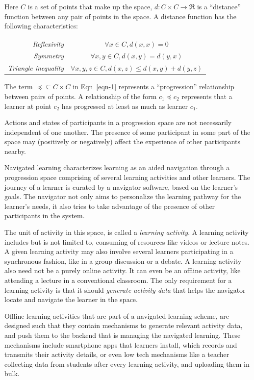 \begin{multicols}{2}
Here $C$ is a set of points that make up the space, $d : C \times C → \Re$ is a “distance” function between any pair of points in the space. A distance function has the following characteristics:

\noindent
\begin{tabular}{@{}r@{~~}c@{}}
\textit{Reflexivity} &  $\forall x \in C, d(x, x) = 0$\\[3pt]
\textit{Symmetry} &  $\forall x, y \in C, d(x, y) = d(y, x)$\\[3pt]
\textit{Triangle inequality} & $\forall x, y, z \in C, d(x, z)\leq d(x, y) + d(y, z)$
\end{tabular}

The term $\preceq \subseteq C \times C$ in Eqn~\ref{eqn-1} represents a “progression” relationship between pairs of points. A relationship of the form $c_1 \preceq c_2$ represents that a learner at point $c_2$  has progressed at least as much as learner $c_1$. 

Actions and states of participants in a progression space are not necessarily independent of one another. The presence of some participant in some part of the space may (positively or negatively) affect the experience of other participants nearby.

Navigated learning characterizes learning as an aided navigation through a progression space comprising of several learning activities and other learners. The journey of a learner is curated by a navigator software, based on the learner’s goals. The navigator not only aims to personalize the learning pathway for the learner’s needs, it also tries to take advantage of the presence of other participants in the system.

The unit of activity in this space, is called a \textit{learning activity}. A learning activity includes but is not limited to, consuming of resources like videos or lecture notes. A given learning activity may also involve several learners participating in a synchronous fashion, like in a group discussion or a debate. A learning activity also need not be a purely online activity. It can even be an offline activity, like attending a lecture in a conventional classroom. The only requirement for a learning activity is that it should \textit{generate activity data} that helps the navigator locate and navigate the learner in the space.

Offline learning activities that are part of a navigated learning scheme, are designed such that they contain mechanisms to generate relevant activity data, and push them to the backend that is managing the navigated learning. These mechanisms include smartphone apps that learners install, which records and transmits their activity details, or even low tech mechanisms like a teacher collecting data from students after every learning activity, and uploading them in bulk.


\end{multicols}
